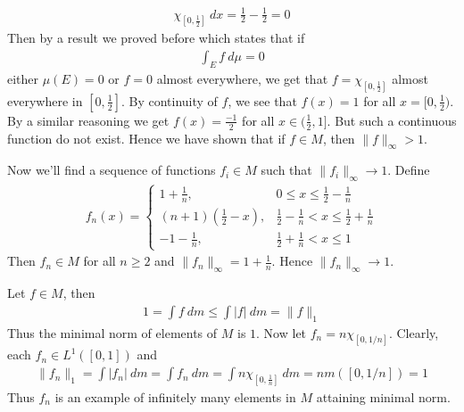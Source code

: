 \documentclass[12pt]{exam}
\theoremstyle{plain} %
\theoremstyle{definition} %
\theoremstyle{remark} %
\begin{document}
\begin{questions}
\begin{solution}
\begin{align*}
      \chi_{[0, \frac{1}{2}]} \ dx = \frac{1}{2} - \frac{1}{2} = 0
    \end{align*}
    Then by a result we proved before which states that if
    \begin{align*}
      \int_E  f \ d \mu = 0
    \end{align*}
    either $\mu(E) = 0$ or $f = 0$ almost everywhere, we get that $f
    = \chi_{[0, \frac{1}{2}]}$ almost everywhere in $[0,
    \frac{1}{2}]$. By continuity of $f$, we see that $f(x) = 1$ for
    all $x=[0, \frac{1}{2})$.
    By a similar reasoning we get $f(x) = \frac{-1}{2}$ for all $x
    \in (\frac{1}{2}, 1]$. But such a continuous function do not
    exist. Hence we have shown that if $f \in M$, then $\|f\|_\infty > 1$.

    Now we'll find a sequence of functions $f_i \in M$ such that
    $\|f_i\|_\infty \to 1$. Define
    \begin{align*}
      f_n(x) =
      \begin{cases}
        1 + \frac{1}{n}, & 0 \le x \le \frac{1}{2} - \frac{1}{n} \\
        (n+1)(\frac{1}{2} - x), & \frac{1}{2} - \frac{1}{n} < x \le
        \frac{1}{2} + \frac{1}{n} \\
        -1 - \frac{1}{n}, & \frac{1}{2} + \frac{1}{n} < x \le 1
      \end{cases}
    \end{align*}
    Then $f_n \in M$ for all $n \ge 2$ and $\|f_n\|_\infty = 1 +
    \frac{1}{n}$. Hence $ \|f_n\|_\infty \to 1$.
  \end{solution}

  \question
  \begin{solution}
    Let $f \in M$, then
    \begin{align*}
      1 = \int f \ d m \le \int |f| \ d m = \|f\|_1
    \end{align*}
    Thus the minimal norm of elements of $M$ is $1$. Now let $f_n = n
    \chi_{[0, 1/n]}$. Clearly, each $f_n \in L^{1}([0, 1])$ and
    \begin{align*}
      \|f_n\|_1  = \int |f_n| \ d m = \int f_n \ d m = \int n
      \chi_{[0, \frac{1}{n}]} \ d m = n m([0,1/n]) = 1
    \end{align*}
    Thus $f_n$ is an example of infinitely many elements in $M$
    attaining minimal norm.
  \end{solution}


\end{questions}
\end{document}
